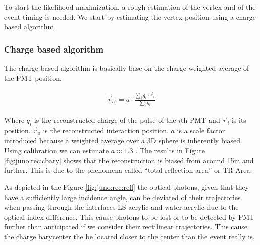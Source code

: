 \documentclass[../main.tex]{subfiles}
\begin{document}
To start the likelihood maximization, a rough estimation of the vertex and of the event timing is needed. We start by estimating the vertex position using a charge based algorithm.

\subsubsection{Charge based algorithm}

The charge-based algorithm is basically base on the charge-weighted average of the PMT position.

\begin{align}
  \vec{r}_{cb} = a\cdot\frac{\sum_i q_i \cdot \vec{r}_i}{\sum_i q_i}
\end{align}

Where $q_i$ is the reconstructed charge of the pulse of the $i$th PMT and $\vec{r}_i$ is its position. $\vec{r}_0$ is the reconstructed interaction position. $a$ is a scale factor introduced because a weighted average over a 3D sphere is inherently biased. Using calibration we can estimate $a \approx 1.3$ \cite{li_event_2021}. The results in Figure \ref{fig:juno:rec:cbary} shows that the reconstruction is biased from around 15m and further. This is due to the phenomena called ``total reflection area'' or TR Area.

As depicted in the Figure \ref{fig:juno:rec:refl} the optical photons, given that they have a sufficiently large incidence angle, can be deviated of their trajectories when passing through the interfaces LS-acrylic and water-acrylic due to the optical index difference. This cause photons to be lost or to be detected by PMT further than anticipated if we consider their rectilinear trajectories. This cause the charge barycenter the be located closer to the center than the event really is.
\end{document}
